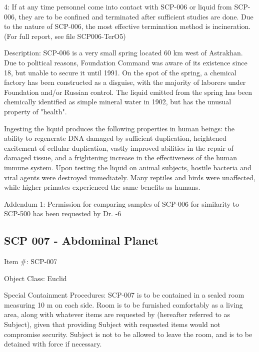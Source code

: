 \documentclass[a4paper, 11pt]{article}
\begin{document}
4: If at any time personnel come into contact with SCP-006 or liquid from SCP-006, they are to be confined and terminated after sufficient studies are done. Due to the nature of SCP-006, the most effective termination method is incineration. (For full report, see file SCP006-TerO5)

Description: SCP-006 is a very small spring located 60 km west of Astrakhan. Due to political reasons, Foundation Command was aware of its existence since 18, but unable to secure it until 1991. On the spot of the spring, a chemical factory has been constructed as a disguise, with the majority of laborers under Foundation and/or Russian control. The liquid emitted from the spring has been chemically identified as simple mineral water in 1902, but has the unusual property of "health".

Ingesting the liquid produces the following properties in human beings: the ability to regenerate DNA damaged by sufficient duplication, heightened excitement of cellular duplication, vastly improved abilities in the repair of damaged tissue, and a frightening increase in the effectiveness of the human immune system. Upon testing the liquid on animal subjects, hostile bacteria and viral agents were destroyed immediately. Many reptiles and birds were unaffected, while higher primates experienced the same benefits as humans.

Addendum 1: Permission for comparing samples of SCP-006 for similarity to SCP-500 has been requested by Dr. -6

\newpage
\subsection{SCP 007 - Abdominal Planet}
Item \#: SCP-007

Object Class: Euclid

Special Containment Procedures: SCP-007 is to be contained in a sealed room measuring 10 m on each side. Room is to be furnished comfortably as a living area, along with whatever items are requested by  (hereafter referred to as Subject), given that providing Subject with requested items would not compromise security. Subject is not to be allowed to leave the room, and is to be detained with force if necessary.
\end{document}
